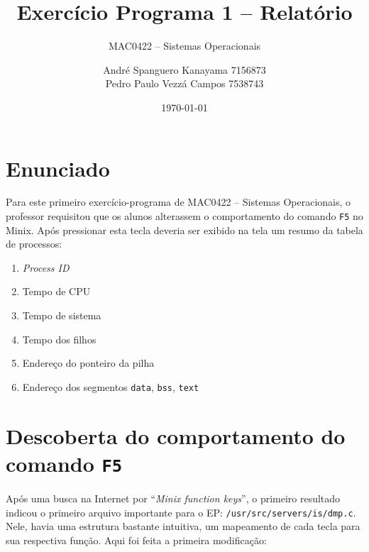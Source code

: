 \documentclass[brazil, a4paper]{scrartcl}
\begin{document}
\title{Exercício Programa 1 -- Relatório}
\subtitle{MAC0422 -- Sistemas Operacionais}
\author{André Spanguero Kanayama \hfill 7156873\\
		Pedro Paulo Vezzá Campos \hfill 7538743}
\date{\today}

\maketitle


\section{Enunciado}
Para este primeiro exercício-programa de MAC0422 -- Sistemas Operacionais, o 
professor requisitou que os alunos alterassem o comportamento do comando
\texttt{F5} no Minix. Após pressionar esta tecla deveria ser exibido
na tela um resumo da tabela de processos:

\begin{enumerate}
	\item \emph{Process ID}
	\item Tempo de CPU
	\item Tempo de sistema
	\item Tempo dos filhos
	\item Endereço do ponteiro da pilha
	\item Endereço dos segmentos \texttt{data}, \texttt{bss}, \texttt{text} 
\end{enumerate}

\section{Descoberta do comportamento do comando \texttt{F5}}
Após uma busca na Internet por ``\emph{Minix function keys}'', o primeiro
resultado indicou o primeiro arquivo importante para o EP: 
\texttt{/usr/src/servers/is/dmp.c}. Nele, havia uma estrutura bastante
intuitiva, um mapeamento de cada tecla para sua respectiva função. Aqui foi
feita a primeira modificação:
\end{document}
